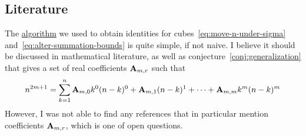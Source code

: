 ﻿\subsection{Literature}\label{subsec:literature}
The \hyperref[itm:cubes-algorithm]{algorithm} we used to obtain identities for
cubes~\eqref{eq:move-n-under-sigma} and~\eqref{eq:alter-summation-bounds} is quite simple, if not naive.
I believe it should be discussed in mathematical literature, as well as conjecture~\eqref{conj:generalization}
that gives a set of real coefficients ${\mathbf{A}} \sb{m,r}$ such that
\begin{align*}
    n^{2m+1} = \sum_{k=1}^{n} {\mathbf{A}} \sb{m,0} k^0 (n-k)^0 + {\mathbf{A}} \sb{m,1} (n-k)^1
    + \cdots + {\mathbf{A}} \sb{m,m} k^m (n-k)^m
\end{align*}
However, I was not able to find any references that in particular mention coefficients ${\mathbf{A}} \sb{m,r}$,
which is one of open questions.
